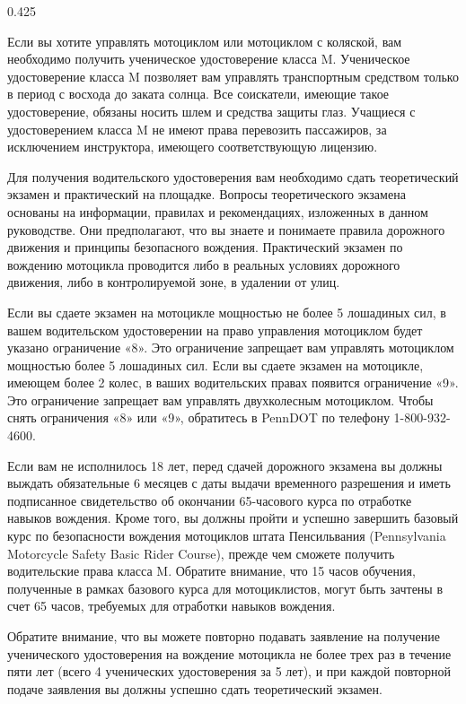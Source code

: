\begin{langblock}{0.425}
\begin{rus}
		Если вы хотите управлять мотоциклом или мотоциклом с коляской, вам необходимо получить ученическое удостоверение класса M. Ученическое удостоверение класса M позволяет вам управлять транспортным средством только в период с восхода до заката солнца. Все соискатели, имеющие такое удостоверение, обязаны носить шлем и средства защиты глаз. Учащиеся с удостоверением класса M не имеют права перевозить пассажиров, за исключением инструктора, имеющего соответствующую лицензию.
		
		Для получения водительского удостоверения вам необходимо сдать теоретический экзамен и практический на площадке. Вопросы теоретического экзамена основаны на информации, правилах и рекомендациях, изложенных в данном руководстве. Они предполагают, что вы знаете и понимаете правила дорожного движения и принципы безопасного вождения. Практический экзамен по вождению мотоцикла проводится либо в реальных условиях дорожного движения, либо в контролируемой зоне, в удалении от улиц.
		
		Если вы сдаете экзамен на мотоцикле мощностью не более 5 лошадиных сил, в вашем водительском удостоверении на право управления мотоциклом будет указано ограничение «8». Это ограничение запрещает вам управлять мотоциклом мощностью более 5 лошадиных сил. Если вы сдаете экзамен на мотоцикле, имеющем более 2 колес, в ваших водительских правах появится ограничение «9». Это ограничение запрещает вам управлять двухколесным мотоциклом. Чтобы снять ограничения «8» или «9», обратитесь в PennDOT по телефону 1-800-932-4600.
		
		Если вам не исполнилось 18 лет, перед сдачей дорожного экзамена вы должны выждать обязательные 6 месяцев с даты выдачи временного разрешения и иметь подписанное свидетельство об окончании 65-часового курса по отработке навыков вождения. Кроме того, вы должны пройти и успешно завершить базовый курс по безопасности вождения мотоциклов штата Пенсильвания (Pennsylvania Motorcycle Safety Basic Rider Course), прежде чем сможете получить водительские права класса M. Обратите внимание, что 15 часов обучения, полученные в рамках базового курса для мотоциклистов, могут быть зачтены в счет 65 часов, требуемых для отработки навыков вождения.
		
		Обратите внимание, что вы можете повторно подавать заявление на получение ученического удостоверения на вождение мотоцикла не более трех раз в течение пяти лет (всего 4 ученических удостоверения за 5 лет), и при каждой повторной подаче заявления вы должны успешно сдать теоретический экзамен.
\end{rus}
\end{langblock}